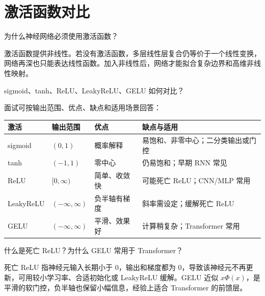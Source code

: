 \section{激活函数对比}
\begin{interview}
为什么神经网络必须使用激活函数？
\end{interview}
\begin{answer}
激活函数提供非线性。若没有激活函数，多层线性层复合仍等价于一个线性变换，网络再深也只能表达线性函数。加入非线性后，网络才能拟合复杂边界和高维非线性映射。
\end{answer}
\begin{interview}
sigmoid、tanh、ReLU、LeakyReLU、GELU 如何对比？
\end{interview}
\begin{answer}
面试可按输出范围、优点、缺点和适用场景回答：
\begin{center}
\begin{tabular}{llll}
\toprule
激活 & 输出范围 & 优点 & 缺点与适用 \\
\midrule
sigmoid & $(0,1)$ & 概率解释 & 易饱和、非零中心；二分类输出或门控 \\
tanh & $(-1,1)$ & 零中心 & 仍易饱和；早期 RNN 常见 \\
ReLU & $[0,\infty)$ & 简单、收敛快 & 可能死亡 ReLU；CNN/MLP 常用 \\
LeakyReLU & $(-\infty,\infty)$ & 负半轴有梯度 & 斜率需设定；缓解死亡 ReLU \\
GELU & $(-\infty,\infty)$ & 平滑、效果好 & 计算稍复杂；Transformer 常用 \\
\bottomrule
\end{tabular}
\end{center}
\end{answer}
\begin{interview}
什么是死亡 ReLU？为什么 GELU 常用于 Transformer？
\end{interview}
\begin{answer}
死亡 ReLU 指神经元输入长期小于 $0$，输出和梯度都为 $0$，导致该神经元不再更新，可用较小学习率、合适初始化或 LeakyReLU 缓解。GELU 近似 $x\Phi(x)$，是平滑的软门控，负半轴也保留小幅信息，经验上适合 Transformer 的前馈层。
\end{answer}
